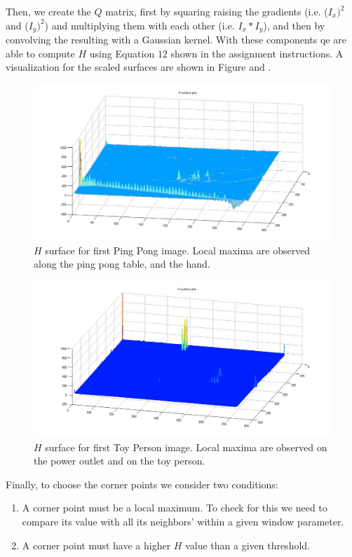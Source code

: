 \documentclass[11pt]{article}
\begin{document}
Then, we create the $Q$ matrix, first by squaring raising the gradients (i.e.
($I_x)^2$ and ($I_y)^2$) and multiplying them with each other (i.e. $I_x *
I_y$), and then by convolving the resulting with a Gaussian kernel. With these
components qe are able to compute $H$ using Equation $12$ shown in the
assignment instructions. A visualization for the scaled surfaces are shown in
Figure and  .

\begin{figure}[H] \centering
	\includegraphics[width=1\textwidth]{imgs/surface_pingpong.jpg}
	\caption{$H$ surface for first Ping Pong image. Local maxima are
		observed along the ping pong table, and the hand.}
	\label{fig:surface_pingpong}
\end{figure}

\begin{figure}[H] \centering
	\includegraphics[width=1\textwidth]{imgs/surface_person.jpg}
	\caption{$H$ surface for first Toy Person image. Local maxima are
		observed on the power outlet and on the toy person.}
	\label{fig:surface_person}
\end{figure}

Finally, to choose the corner points we consider two conditions:
\begin{enumerate} 
	\item A corner point must be a local maximum. To check for
		this we need to compare its value with all its neighbors' within
		a given window parameter.
	\item A corner point must have a higher $H$
		value than a given threshold.
\end{enumerate}
\end{document}

